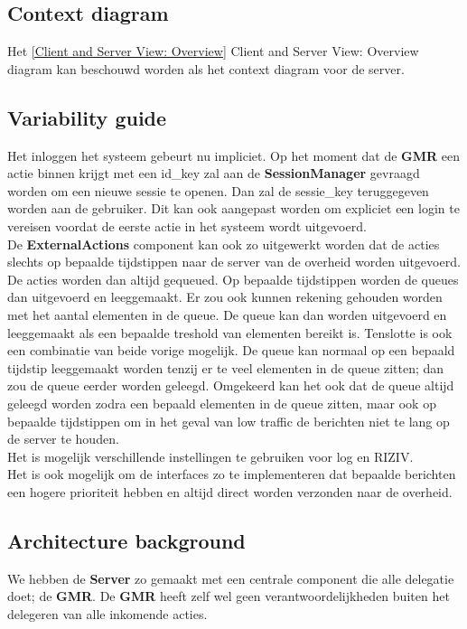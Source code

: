 \documentclass[a4paper,10pt]{article}
\begin{document}
\subsection{Context diagram}
Het \ref{Client and Server View: Overview} Client and Server View: Overview diagram kan beschouwd worden als het context diagram voor de server.

\subsection{Variability guide}
Het inloggen het systeem gebeurt nu impliciet.  Op het moment dat de \textbf{GMR} een actie binnen krijgt met een id\_key zal aan de \textbf{SessionManager} gevraagd worden om een nieuwe sessie te openen.  Dan zal de sessie\_key teruggegeven worden aan de gebruiker.  Dit kan ook aangepast worden om expliciet een login te vereisen voordat de eerste actie in het systeem wordt uitgevoerd.\\
De \textbf{ExternalActions} component kan ook zo uitgewerkt worden dat de acties slechts op bepaalde tijdstippen naar de server van de overheid worden uitgevoerd.  De acties worden dan altijd gequeued.  Op bepaalde tijdstippen worden de queues dan uitgevoerd en leeggemaakt.  Er zou ook kunnen rekening gehouden worden met het aantal elementen in de queue.  De queue kan dan worden uitgevoerd en leeggemaakt als een bepaalde treshold van elementen bereikt is.  Tenslotte is ook een combinatie van beide vorige mogelijk.  De queue kan normaal op een bepaald tijdstip leeggemaakt worden tenzij er te veel elementen in de queue zitten; dan zou de queue eerder worden geleegd.  Omgekeerd kan het ook dat de queue altijd geleegd worden zodra een bepaald elementen in de queue zitten, maar ook op bepaalde tijdstippen om in het geval van low traffic de berichten niet te lang op de server te houden.\\
Het is mogelijk verschillende instellingen te gebruiken voor log en RIZIV.\\
Het is ook mogelijk om de interfaces zo te implementeren dat bepaalde berichten een hogere prioriteit hebben en altijd direct worden verzonden naar de overheid.

\subsection{Architecture background}
We hebben de \textbf{Server} zo gemaakt met een centrale component die alle delegatie doet; de \textbf{GMR}.  De \textbf{GMR} heeft zelf wel geen verantwoordelijkheden buiten het delegeren van alle inkomende acties.
\end{document}
